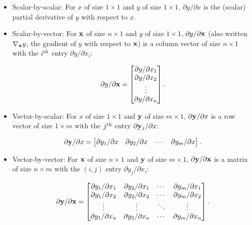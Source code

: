 \begin{itemize}

  \item Scalar-by-scalar: For $x$ of size $1\times 1$ and $y$ of size $1\times 1$,
        $\partial y/\partial x$ is the (scalar) partial derivative of $y$
        with respect to $x$.

  \item Scalar-by-vector: For ${\bf x}$ of size $n\times 1$ and $y$ of size $1\times 1$,
        $\partial y/\partial {\bf x}$ (also written $\nabla_{\bf x} y$, the gradient of $y$ with respect to ${\bf x}$)
        is a column vector of size $n\times 1$ with the $i^{\rm th}$ entry $\partial y/\partial
          x_i$:

        \begin{align*}
          \partial y/\partial {\bf x}=
          \begin{bmatrix}
            \partial y/\partial x_1 \\ \partial y/\partial x_2 \\ \vdots \\ \partial y/\partial x_n
          \end{bmatrix}.
        \end{align*}

  \item Vector-by-scalar: For $x$ of size $1\times 1$ and ${\bf y}$ of size $m\times 1$,
        $\partial {\bf y}/\partial x$ is a row vector of size $1 \times m$ with the
        $j^{\rm th}$ entry $\partial {\bf y}_j/\partial x$:

        \begin{align*}
          \partial {\bf y}/\partial x=
          \begin{bmatrix}
            \partial y_1/\partial x & \partial y_2/\partial x & \cdots & \partial y_m/\partial x
          \end{bmatrix}.
        \end{align*}

  \item Vector-by-vector: For ${\bf x}$ of size $n\times 1$ and ${\bf y}$ of size $m\times 1$,
        $\partial {\bf y}/\partial {\bf x}$ is a matrix of size $n\times m$ with the
        $(i, j)$ entry $\partial y_j/\partial x_i$:

        \begin{align*}
          \partial {\bf y}/\partial {\bf x}=
          \begin{bmatrix}
            \partial y_1/\partial x_1 & \partial y_2/\partial x_1 & \cdots & \partial y_m/\partial x_1 \\
            \partial y_1/\partial x_2 & \partial y_2/\partial x_2 & \cdots & \partial y_m/\partial x_2 \\
            \vdots                    & \vdots                    & \ddots & \vdots                    \\
            \partial y_1/\partial x_n & \partial y_2/\partial x_n & \cdots & \partial y_m/\partial x_n \\
          \end{bmatrix}.
        \end{align*}


\end{itemize}
